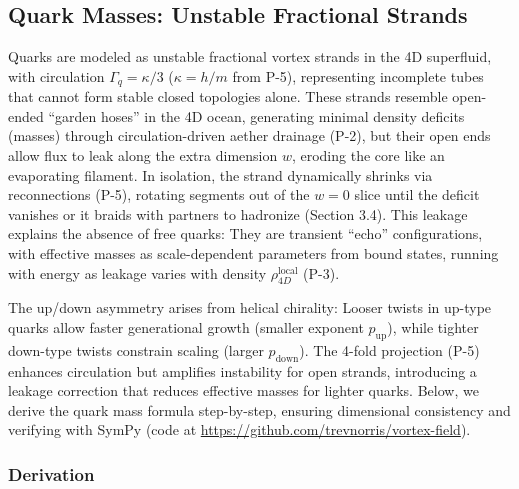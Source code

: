 \subsection{Quark Masses: Unstable Fractional Strands}

Quarks are modeled as unstable fractional vortex strands in the 4D superfluid, with circulation $\Gamma_q = \kappa / 3$ ($\kappa = h / m$ from P-5), representing incomplete tubes that cannot form stable closed topologies alone. These strands resemble open-ended ``garden hoses'' in the 4D ocean, generating minimal density deficits (masses) through circulation-driven aether drainage (P-2), but their open ends allow flux to leak along the extra dimension $w$, eroding the core like an evaporating filament. In isolation, the strand dynamically shrinks via reconnections (P-5), rotating segments out of the $w=0$ slice until the deficit vanishes or it braids with partners to hadronize (Section 3.4). This leakage explains the absence of free quarks: They are transient ``echo'' configurations, with effective masses as scale-dependent parameters from bound states, running with energy as leakage varies with density $\rho_{4D}^{\text{local}}$ (P-3).

The up/down asymmetry arises from helical chirality: Looser twists in up-type quarks allow faster generational growth (smaller exponent $p_{\text{up}}$), while tighter down-type twists constrain scaling (larger $p_{\text{down}}$). The 4-fold projection (P-5) enhances circulation but amplifies instability for open strands, introducing a leakage correction that reduces effective masses for lighter quarks. Below, we derive the quark mass formula step-by-step, ensuring dimensional consistency and verifying with SymPy (code at \url{https://github.com/trevnorris/vortex-field}).

\subsubsection{Derivation}

